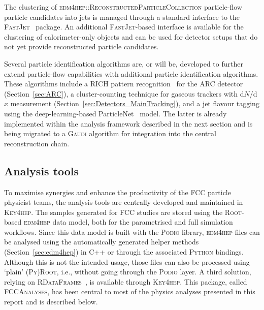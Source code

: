 The clustering of \textsc{edm4hep::ReconstructedParticleCollection} particle-flow particle candidates into jets 
is managed through a standard interface to the \textsc{FastJet}~\cite{fastjet} package. 
An additional \textsc{FastJet}-based interface is available for the clustering of calorimeter-only objects 
and can be used for detector setups that do not yet provide reconstructed particle candidates.

Several particle identification algorithms are, or will be, developed to further extend particle-flow capabilities with additional particle identification algorithms. 
These algorithms include a RICH pattern recognition~\cite{Forty1998} for the ARC detector (Section~\ref{sec:ARC}), 
a cluster-counting technique for gaseous trackers with d$N$/d$x$ measurement (Section~\ref{sec:Detectors_MainTracking}), 
and a jet flavour tagging using the deep-learning-based ParticleNet~\cite{particlenet} model. 
The latter is already implemented within the analysis framework described in the next section 
and is being migrated to a \textsc{Gaudi} algorithm for integration into the central reconstruction chain.

\subsection{Analysis tools}
\label{sec:analyses}

To maximise synergies and enhance the productivity of the FCC particle physicist teams, the analysis tools are centrally developed and maintained in \textsc{Key4hep}. 
The samples generated for FCC studies are stored using the \textsc{Root}-based \textsc{edm4hep} data model, 
both for the parametrised and full simulation workflows. 
Since this data model is built with the \textsc{Podio} library, 
\textsc{edm4hep} files can be analysed using the automatically generated helper methods (Section~\ref{sec:edm4hep}) 
in C++ or through the associated \textsc{Python} bindings. 
Although this is not the intended usage, those files can also be processed using `plain' (\textsc{Py})\textsc{Root}, 
i.e., without going through the \textsc{Podio} layer. 
A third solution, relying on \textsc{RDataFrames}~\cite{rdataframe}, is available through \textsc{Key4hep}. 
This package, called \textsc{FCCAnalyses}, has been central to most of the physics analyses presented in this report and is described below.

